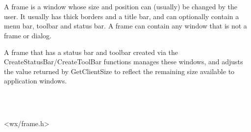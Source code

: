 \section{}\label{wxframe}

A frame is a window whose size and position can (usually) be changed by the
user. It usually has thick borders and a title bar, and can optionally contain
a menu bar, toolbar and status bar. A frame can contain any window that is not
a frame or dialog.

A frame that has a status bar and toolbar created via the
CreateStatusBar/CreateToolBar functions manages these windows, and adjusts the
value returned by GetClientSize to reflect the remaining size available to
application windows.


\\
\\


<wx/frame.h>


